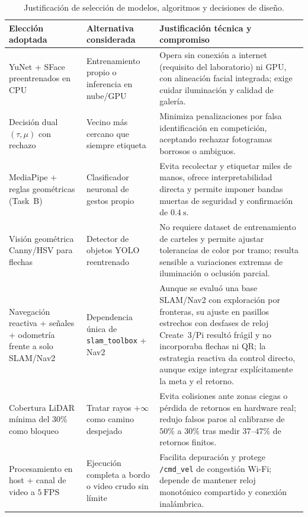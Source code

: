 \documentclass[11pt,a4paper]{article}
\begin{document}
\begin{table}[H]
  \centering
  \small
  \begin{tabularx}{\textwidth}{@{}P{3.4cm}P{4.2cm}Y@{}}
    \hline
    \textbf{Elección adoptada} & \textbf{Alternativa considerada} & \textbf{Justificación técnica y compromiso}\\
    \hline
    YuNet + SFace preentrenados en CPU &
    Entrenamiento propio o inferencia en nube/GPU &
    Opera sin conexión a internet (requisito del laboratorio) ni GPU, con
    alineación facial integrada; exige cuidar iluminación y calidad de galería.\\
    Decisión dual $(\tau,\mu)$ con rechazo &
    Vecino más cercano que siempre etiqueta &
    Minimiza penalizaciones por falsa identificación en competición, aceptando
    rechazar fotogramas borrosos o ambiguos.\\
    MediaPipe + reglas geométricas (Task~B) &
    Clasificador neuronal de gestos propio &
    Evita recolectar y etiquetar miles de manos, ofrece interpretabilidad directa
    y permite imponer bandas muertas de seguridad y confirmación de $0.4\ \mathrm{s}$.\\
    Visión geométrica Canny/HSV para flechas &
    Detector de objetos YOLO reentrenado &
    No requiere dataset de entrenamiento de carteles y permite ajustar
    tolerancias de color por tramo; resulta sensible a variaciones extremas de
    iluminación o oclusión parcial.\\
    Navegación reactiva + señales + odometría frente a solo SLAM/Nav2 &
    Dependencia única de \texttt{slam\_toolbox} + Nav2 &
    Aunque se evaluó una base SLAM/Nav2 con exploración por fronteras, su
    ajuste en pasillos estrechos con desfases de reloj Create~3/Pi resultó
    frágil y no incorporaba flechas ni QR; la estrategia reactiva da control
    directo, aunque exige integrar explícitamente la meta y el retorno.\\
    Cobertura LiDAR mínima del $30\%$ como bloqueo &
    Tratar rayos $+\infty$ como camino despejado &
    Evita colisiones ante zonas ciegas o pérdida de retornos en hardware real;
    redujo falsos paros al calibrarse de $50\%$ a $30\%$ tras medir $37$--$47\%$
    de retornos finitos.\\
    Procesamiento en host + canal de video a $5\ \mathrm{FPS}$ &
    Ejecución completa a bordo o video crudo sin límite &
    Facilita depuración y protege \texttt{/cmd\_vel} de congestión Wi-Fi;
    depende de mantener reloj monotónico compartido y conexión inalámbrica.\\
    \hline
  \end{tabularx}
  \caption{Justificación de selección de modelos, algoritmos y decisiones de diseño.}
  \label{tab:justificacion}
\end{table}
\end{document}
